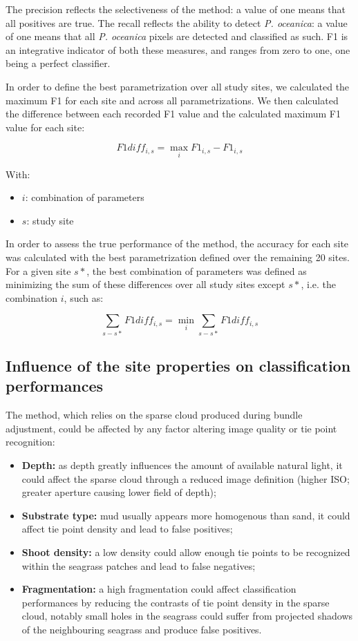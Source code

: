 The precision reflects the selectiveness of the method: a value of one means that all positives are true. The recall reflects the ability to detect \textit{P. oceanica}: a value of one means that all \textit{P. oceanica} pixels are detected and classified as such. F1 is an integrative indicator of both these measures, and ranges from zero to one, one being a perfect classifier.

In order to define the best parametrization over all study sites, we calculated the maximum F1 for each site and across all parametrizations. We then calculated the difference between each recorded F1 value and the calculated maximum F1 value for each site:

\begin{equation}
    F1diff_{i,s}=\max_i{F1_{i,s}}-F1_{i,s}
\end{equation}

With:
\begin{itemize}
\item $i$: combination of parameters
\item $s$: study site
\end{itemize}

In order to assess the true performance of the method, the accuracy for each site was calculated with the best parametrization defined over the remaining 20 sites. For a given site $s*$, the best combination of parameters was defined as minimizing the sum of these differences over all study sites except $s*$, i.e. the combination $i$, such as:


\begin{equation}
    \sum_{s-s*}{F1diff_{i,s}}=\min_i{\sum_{s-s*}{F1diff_{i,s}}}
\end{equation}

\subsection{Influence of the site properties on classification performances}
The method, which relies on the sparse cloud produced during bundle adjustment, could be affected by any factor altering image quality or tie point recognition:

\begin{itemize}
\item \textbf{Depth:} as depth greatly influences the amount of available natural light, it could affect the sparse cloud through a reduced image definition (higher ISO; greater aperture causing lower field of depth);
\item \textbf{Substrate type:} mud usually appears more homogenous than sand, it could affect tie point density and lead to false positives;
\item \textbf{Shoot density:} a low density could allow enough tie points to be recognized within the seagrass patches and lead to false negatives;
\item \textbf{Fragmentation:} a high fragmentation could affect classification performances by reducing the contrasts of tie point density in the sparse cloud, notably small holes in the seagrass could suffer from projected shadows of the neighbouring seagrass and produce false positives.
\end{itemize}

